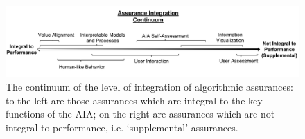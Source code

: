 \begin{figure}[!t]%
    \centering
    \includegraphics[width=1.0\textwidth]{Figures/Assurance_Integration.pdf}
    \caption{The continuum of the level of integration of algorithmic assurances: to the left are those assurances which are integral to the key functions of the AIA; on the right are assurances which are not integral to performance, i.e. `supplemental' assurances.}
    \label{fig:assurance_continuum}
    \vspace{-0.2 in}
\end{figure}









